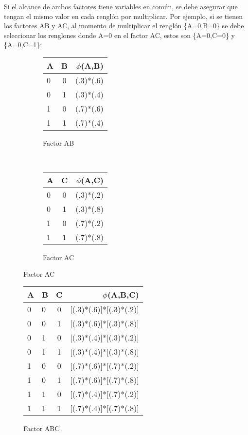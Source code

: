 \noindent Si el alcance de ambos factores tiene variables en común, se debe asegurar que tengan el mismo valor en cada renglón por multiplicar. Por ejemplo, si se tienen los factores AB y AC, al momento de multiplicar el renglón \{A=0,B=0\} se debe seleccionar los renglones donde A=0 en el factor AC, estos son \{A=0,C=0\} y \{A=0,C=1\}:

\begin{figure}[h!]
    \centering
    \begin{subfigure}[b]{0.4\textwidth}
        \centering
        \begin{tabular}{ l  c | r }
          A & B & $\phi$(A,B)\\ \hline
          0 & 0 & (.3)*(.6)  \\ \hline
          0 & 1 & (.3)*(.4)  \\ \hline
          1 & 0 & (.7)*(.6)  \\ \hline
          1 & 1 & (.7)*(.4)  \\
        \end{tabular}
        \caption{Factor AB}
    \end{subfigure}
    ~ 
    \begin{subfigure}[b]{0.4\textwidth}
        \centering
        \begin{tabular}{ l  c | r }
          A & C & $\phi$(A,C)\\ \hline
          0 & 0 & (.3)*(.2)  \\ \hline
          0 & 1 & (.3)*(.8)  \\ \hline
          1 & 0 & (.7)*(.2)  \\ \hline
          1 & 1 & (.7)*(.8)  \\
        \end{tabular}
        \caption{Factor AC}
    \end{subfigure}
\end{figure}


\begin{figure}[H]
  \begin{center}
    \begin{tabular}{ l  l  c | r }
      A & B & C & $\phi$(A,B,C)\\ \hline
      0 & 0 & 0 & [(.3)*(.6)]*[(.3)*(.2)]  \\ \hline
      0 & 0 & 1 & [(.3)*(.6)]*[(.3)*(.8)]  \\ \hline
      0 & 1 & 0 & [(.3)*(.4)]*[(.3)*(.2)]  \\ \hline
      0 & 1 & 1 & [(.3)*(.4)]*[(.3)*(.8)]  \\ \hline
      1 & 0 & 0 & [(.7)*(.6)]*[(.7)*(.2)]  \\ \hline
      1 & 0 & 1 & [(.7)*(.6)]*[(.7)*(.8)]  \\ \hline
      1 & 1 & 0 & [(.7)*(.4)]*[(.7)*(.2)]  \\ \hline
      1 & 1 & 1 & [(.7)*(.4)]*[(.7)*(.8)]  \\ 
    \end{tabular}
  \end{center}
  \caption{Factor ABC}
  \label{fig:FactorABC}
\end{figure}

